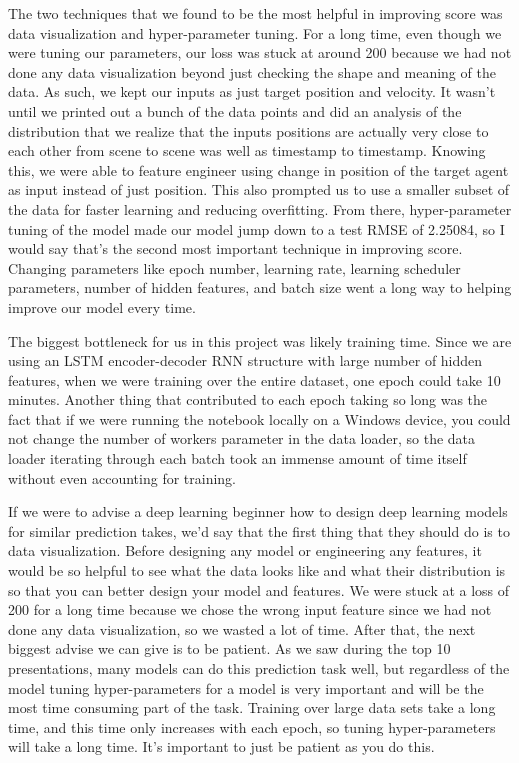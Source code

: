 \documentclass{article}
\begin{document}
The two techniques that we found to be the most helpful in improving score was data visualization and hyper-parameter tuning. For a long time, even though we were tuning our parameters, our loss was stuck at around 200 because we had not done any data visualization beyond just checking the shape and meaning of the data. As such, we kept our inputs as just target position and velocity. It wasn't until we printed out a bunch of the data points and did an analysis of the distribution that we realize that the inputs positions are actually very close to each other from scene to scene was well as timestamp to timestamp. Knowing this, we were able to feature engineer using change in position of the target agent as input instead of just position. This also prompted us to use a smaller subset of the data for faster learning and reducing overfitting. From there, hyper-parameter tuning of the model made our model jump down to a test RMSE of 2.25084, so I would say that's the second most important technique in improving score. Changing parameters like epoch number, learning rate, learning scheduler parameters, number of hidden features, and batch size went a long way to helping improve our model every time. 

The biggest bottleneck for us in this project was likely training time. Since we are using an LSTM encoder-decoder RNN structure with large number of hidden features, when we were training over the entire dataset, one epoch could take 10 minutes. Another thing that contributed to each epoch taking so long was the fact that if we were running the notebook locally on a Windows device, you could not change the number of workers parameter in the data loader, so the data loader iterating through each batch took an immense amount of time itself without even accounting for training. 

If we were to advise a deep learning beginner how to design deep learning models for similar prediction takes, we'd say that the first thing that they should do is to data visualization. Before designing any model or engineering any features, it would be so helpful to see what the data looks like and what their distribution is so that you can better design your model and features. We were stuck at a loss of 200 for a long time because we chose the wrong input feature since we had not done any data visualization, so we wasted a lot of time. After that, the next biggest advise we can give is to be patient. As we saw during the top 10 presentations, many models can do this prediction task well, but regardless of the model tuning hyper-parameters for a model is very important and will be the most time consuming part of the task. Training over large data sets take a long time, and this time only increases with each epoch, so tuning hyper-parameters will take a long time. It's important to just be patient as you do this. 
\end{document}
